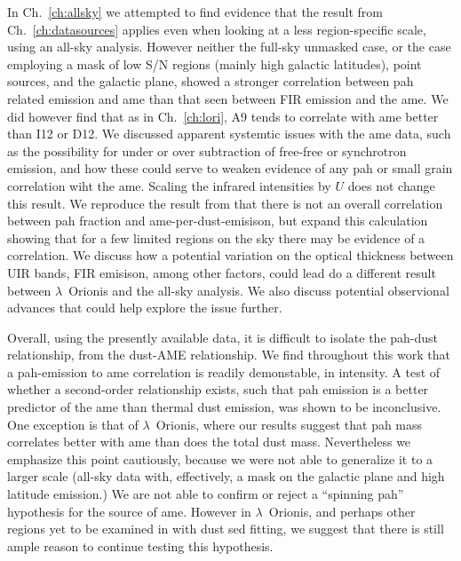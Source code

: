   In Ch.~\ref{ch:allsky} we attempted to find evidence that the result from Ch.~\ref{ch:datasources} applies even when looking at a less region-specific scale, using an all-sky analysis. However neither the full-sky unmasked case, or the case employing a mask of low S/N regions (mainly high galactic latitudes), point sources, and the galactic plane, showed a stronger correlation between \gls{pah} related emission and \gls{ame} than that seen between FIR emission and the \gls{ame}. We did however find that as in Ch.~\ref{ch:lori}, A9 tends to correlate with \gls{ame} better than I12 or D12. We discussed apparent systemtic issues with the \gls{ame} data, such as the possibility for under or over subtraction of free-free or synchrotron emission, and how these could serve to weaken evidence of any \gls{pah} or small grain correlation wiht the \gls{ame}. Scaling the infrared intensities by $U$ does not change this result. We reproduce the result from \cite{hensley16} that there is not an overall correlation between \gls{pah} fraction and \gls{ame}-per-dust-emisison, but expand this calculation showing that for a few limited regions on the sky there may be evidence of a correlation. We discuss how a potential variation on the optical thickness between UIR bands, FIR emisison, among other factors, could lead do a different result between $\lambda$~Orionis and the all-sky analysis. We also discuss potential observional advances that could help explore the issue further.

  Overall, using the presently available data, it is difficult to isolate the \gls{pah}-dust relationship, from the dust-AME relationship. We find throughout this work that a \gls{pah}-emission to \gls{ame} correlation is readily demonstable, in intensity. A test of whether a second-order relationship exists, such that \gls{pah} emission is a better predictor of the \gls{ame} than thermal dust emission, was shown to be inconclusive. One exception is that of $\lambda$~Orionis, where our results suggest that \gls{pah} mass correlates better with \gls{ame} than does the total dust mass. Nevertheless we emphasize this point cautiously, because we were not able to generalize it to a larger scale (all-sky data with, effectively, a mask on the galactic plane and high latitude emission.)  We are not able to confirm or reject a ``spinning \gls{pah}'' hypothesis for the source of \gls{ame}. However in $\lambda$~Orionis, and perhaps other regions yet to be examined in with dust \gls{sed} fitting, we suggest that there is still ample reason to continue testing this hypothesis.
